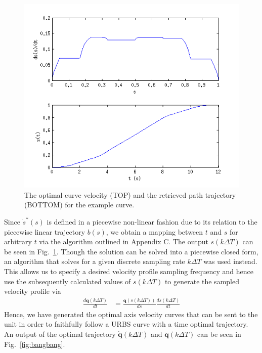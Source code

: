 \begin{figure}  
\includegraphics[width=\textwidth]{figures/optimisation/sdot_st.png}
\caption[$\dot{s}^*(s)$ and $s^*(t)$]{
The optimal curve velocity (TOP) and the retrieved path trajectory (BOTTOM) for the example curve.
\label{fig:sdot_st}}
\end{figure}

Since $\dot{s}^*(s)$ is defined in a piecewise non-linear fashion due to its relation to the piecewise linear trajectory $b(s)$, we obtain a mapping between $t$ and $s$ for arbitrary $t$ via the algorithm outlined in Appendix C. The output $s(k\Delta T)$ can be seen in Fig.~\ref{fig:sdot_st}. Though the solution can be solved into a piecewise closed form, an algorithm that solves for a given discrete sampling rate $k\Delta T$ was used instead. This allows us to specify a desired velocity profile sampling frequency and hence use the subsequently calculated values of $s(k\Delta T)$ to generate the sampled velocity profile via 
\begin{align*}
\frac{d\textbf{q}\left(k \Delta T\right)}{dt} &= \frac{\textbf{q}\left(s(k\Delta T)\right)}{ds}\frac{ds(k\Delta T)}{dt}
\end{align*}
Hence, we have generated the optimal axis velocity curves that can be sent to the unit in order to faithfully follow a URBS curve with a time optimal trajectory.
An output of the optimal trajectory $\dot{\textbf{q}}(k\Delta T)$ and $\ddot{\textbf{q}}(k\Delta T)$ can be seen in Fig.~\ref{fig:bangbang}.


